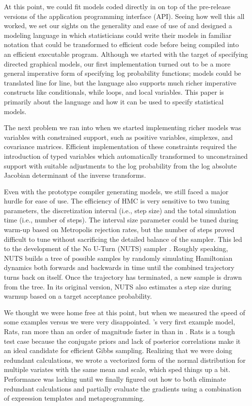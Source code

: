 \documentclass[article]{jss}
\begin{document}
At this point, we could fit models coded directly in  on
top of the pre-release versions of the  application
programming interface (API).  Seeing how well this all worked, we set
our sights on the generality and ease of use of  and
designed a modeling language in which statisticians could write their
models in familiar notation that could be transformed to efficient
 code before being compiled into an efficient executable
program.  Although we started with the target of specifying directed
graphical models, our first implementation turned out to be a more
general imperative form of specifying log probability functions;
 models could be translated line for line, but the
 language also supports much richer imperative
constructs like conditionals, while loops, and local variables.  This
paper is primarily about the  language and how it can
be used to specify statistical models.
 
The next problem we ran into when we started implementing richer
models was variables with constrained support, such as positive variables, 
simplexes, and covariance matrices.  
Efficient implementation of these constraints
required the introduction of typed variables which automatically transformed to
unconstrained support with suitable adjustments to the log probability
from the log absolute Jacobian determinant of the inverse transforms.

Even with the prototype compiler generating models, we still faced a
major hurdle for ease of use. The efficiency of HMC is very sensitive
to two tuning parameters, the discretization interval (i.e., step
size) and the total simulation time (i.e., number of steps).  The
interval size parameter could be tuned during warm-up based on
Metropolis rejection rates, but the number of steps proved difficult
to tune without sacrificing the detailed balance of the sampler.  This
led to the development of the No U-Turn (NUTS) sampler
\citep{HoffmanGelman:2011}.  Roughly speaking, NUTS builds a tree of
possible samples by randomly simulating Hamiltonian dynamics both
forwards and backwards in time until the combined trajectory turns
back on itself.  Once the trajectory has terminated, a new sample is
drawn from the tree.  In its original version, NUTS also estimates a
step size during warmup based on a target acceptance probability. 

We thought we were home free at this point, but when we measured the
speed of some  examples versus  we were
very disappointed.  's very first example model, Rats,
ran more than an order of magnitude faster in  than in
.  Rats is a tough test case because the conjugate
priors and lack of posterior correlations make it an ideal candidate
for efficient Gibbs sampling.  Realizing that we were doing redundant
calculations, we wrote a vectorized form of the normal distribution
for multiple variates with the same mean and scale, which sped things
up a bit.  Performance was lacking until we finally figured out how
to both eliminate redundant calculations and partially evaluate the
gradients using a combination of expression templates and
metaprogramming.
\end{document}
